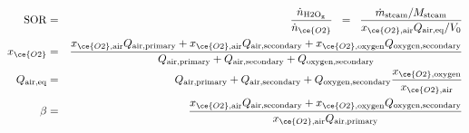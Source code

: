\begin{eqnarray}
\label{eq:SOR} \mathrm{SOR} &=& \frac{\dot n_\mathrm{H2O_g}   }{ \dot n_{\ce{O2}  }} \;\; = \;\;  \frac{  \dot m_\text{steam}/M_\text{steam}   }{  x_{\ce{O2},\text{air}} Q_\text{air,eq} /V_0}\\
\label{eq:xO2} x_{\ce{O2}} &=& \frac{  x_{\ce{O2},\text{air}}Q_\text{air,primary} + x_{\ce{O2},\text{air}}Q_\text{air,secondary} + x_{\ce{O2},\text{oxygen}}Q_\text{oxygen,secondary}                }{       Q_\text{air,primary} + Q_\text{air,secondary} + Q_\text{oxygen,secondary}           }\\
\label{eq:Qair} Q_\text{air,eq} &=& Q_\text{air,primary} + Q_\text{air,secondary} + Q_\text{oxygen,secondary}\frac{x_{\ce{O2},\text{oxygen}}}{x_{\ce{O2},\text{air}}}\\
\label{eq:AR} \beta &=& \frac{   x_{\ce{O2},\text{air}}Q_\text{air,secondary} + x_{\ce{O2},\text{oxygen}}Q_\text{oxygen,secondary}   }{      x_{\ce{O2},\text{air}}Q_\text{air,primary}        } 
\end{eqnarray}

\renewcommand\theadfont{}


